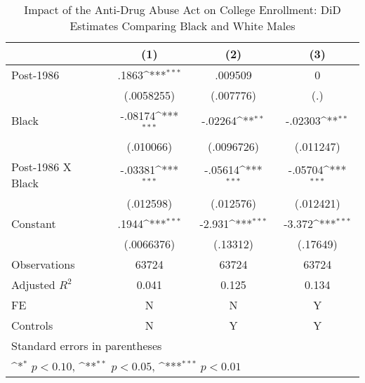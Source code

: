 \begin{table}[htbp]\centering
\def\sym#1{\ifmmode^{#1}\else\(^{#1}\)\fi}
\caption{Impact of the Anti-Drug Abuse Act on College Enrollment: DiD Estimates Comparing Black and White Males}
\begin{tabular}{l*{3}{c}}
\hline\hline
                    &\multicolumn{1}{c}{(1)}         &\multicolumn{1}{c}{(2)}         &\multicolumn{1}{c}{(3)}         \\
\hline
Post-1986           &       .1863\sym{***}&     .009509         &           0         \\
                    &  (.0058255)         &   (.007776)         &         (.)         \\
[1em]
Black               &     -.08174\sym{***}&     -.02264\sym{**} &     -.02303\sym{**} \\
                    &   (.010066)         &  (.0096726)         &   (.011247)         \\
[1em]
Post-1986 X Black   &     -.03381\sym{***}&     -.05614\sym{***}&     -.05704\sym{***}\\
                    &   (.012598)         &   (.012576)         &   (.012421)         \\
[1em]
Constant            &       .1944\sym{***}&      -2.931\sym{***}&      -3.372\sym{***}\\
                    &  (.0066376)         &    (.13312)         &    (.17649)         \\
\hline
Observations        &       63724         &       63724         &       63724         \\
Adjusted \(R^{2}\)  &       0.041         &       0.125         &       0.134         \\
FE                  &           N         &           N         &           Y         \\
Controls            &           N         &           Y         &           Y         \\
\hline\hline
\multicolumn{4}{l}{\footnotesize Standard errors in parentheses}\\
\multicolumn{4}{l}{\footnotesize \sym{*} \(p<0.10\), \sym{**} \(p<0.05\), \sym{***} \(p<0.01\)}\\
\end{tabular}
\end{table}
